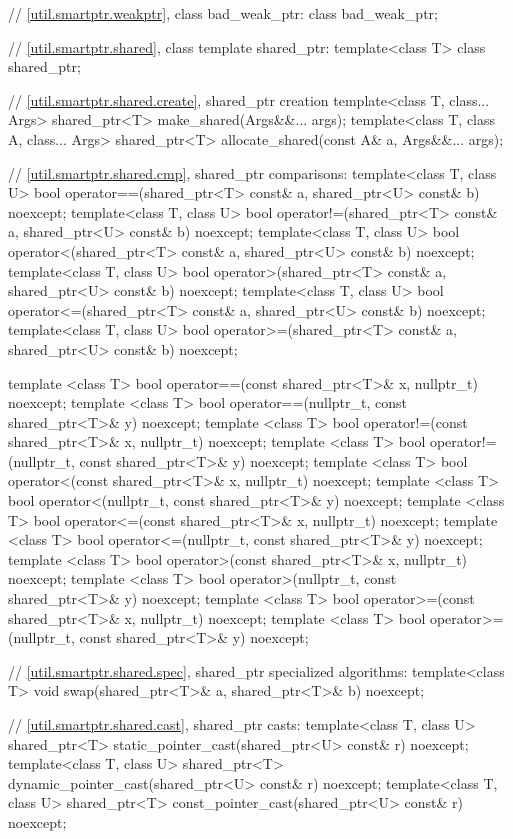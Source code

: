 \begin{codeblock}
{  // \ref{util.smartptr.weakptr}, class bad_weak_ptr:
  class bad_weak_ptr;

  // \ref{util.smartptr.shared}, class template shared_ptr:
  template<class T> class shared_ptr;

  // \ref{util.smartptr.shared.create}, shared_ptr creation
  template<class T, class... Args> shared_ptr<T> make_shared(Args&&... args);
  template<class T, class A, class... Args>
    shared_ptr<T> allocate_shared(const A& a, Args&&... args);

  // \ref{util.smartptr.shared.cmp}, shared_ptr comparisons:
  template<class T, class U>
    bool operator==(shared_ptr<T> const& a, shared_ptr<U> const& b) noexcept;
  template<class T, class U>
    bool operator!=(shared_ptr<T> const& a, shared_ptr<U> const& b) noexcept;
  template<class T, class U>
    bool operator<(shared_ptr<T> const& a, shared_ptr<U> const& b) noexcept;
  template<class T, class U>
    bool operator>(shared_ptr<T> const& a, shared_ptr<U> const& b) noexcept;
  template<class T, class U>
    bool operator<=(shared_ptr<T> const& a, shared_ptr<U> const& b) noexcept;
  template<class T, class U>
    bool operator>=(shared_ptr<T> const& a, shared_ptr<U> const& b) noexcept;

  template <class T>
    bool operator==(const shared_ptr<T>& x, nullptr_t) noexcept;
  template <class T>
    bool operator==(nullptr_t, const shared_ptr<T>& y) noexcept;
  template <class T>
    bool operator!=(const shared_ptr<T>& x, nullptr_t) noexcept;
  template <class T>
    bool operator!=(nullptr_t, const shared_ptr<T>& y) noexcept;
  template <class T>
    bool operator<(const shared_ptr<T>& x, nullptr_t) noexcept;
  template <class T>
    bool operator<(nullptr_t, const shared_ptr<T>& y) noexcept;
  template <class T>
    bool operator<=(const shared_ptr<T>& x, nullptr_t) noexcept;
  template <class T>
    bool operator<=(nullptr_t, const shared_ptr<T>& y) noexcept;
  template <class T>
    bool operator>(const shared_ptr<T>& x, nullptr_t) noexcept;
  template <class T>
    bool operator>(nullptr_t, const shared_ptr<T>& y) noexcept;
  template <class T>
    bool operator>=(const shared_ptr<T>& x, nullptr_t) noexcept;
  template <class T>
    bool operator>=(nullptr_t, const shared_ptr<T>& y) noexcept;

  // \ref{util.smartptr.shared.spec}, shared_ptr specialized algorithms:
  template<class T> void swap(shared_ptr<T>& a, shared_ptr<T>& b) noexcept;

  // \ref{util.smartptr.shared.cast}, shared_ptr casts:
  template<class T, class U>
    shared_ptr<T> static_pointer_cast(shared_ptr<U> const& r) noexcept;
  template<class T, class U>
    shared_ptr<T> dynamic_pointer_cast(shared_ptr<U> const& r) noexcept;
  template<class T, class U>
    shared_ptr<T> const_pointer_cast(shared_ptr<U> const& r) noexcept;

}
\end{codeblock}
